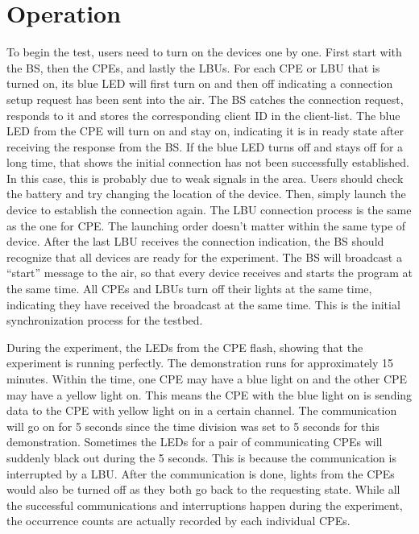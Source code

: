 \section{Operation}

To begin the test, users need to turn on the devices one by one. First start with the BS, then the CPEs, and lastly the LBUs. For each CPE or LBU that is turned on, its blue LED will  first turn on and then off indicating a connection setup request has been sent into the air. The BS catches the connection request, responds to it and stores the corresponding client ID in the client-list. The blue LED from the CPE will turn on and stay on, indicating it is in ready state after receiving the response from the BS. If the blue LED turns off and stays off for a long time, that shows the initial connection has not been successfully established. In this case, this is probably due to weak signals in the area. Users should check the battery and try changing the location of the device. Then, simply launch the device to establish the connection again. The LBU connection process is the same as the one for CPE. The launching order doesn't matter within the same type of device. After the last LBU receives the connection indication, the BS should recognize that all devices are ready for the experiment. The BS will broadcast a ``start'' message to the air, so that every device receives and starts the program at the same time. All CPEs and LBUs turn off their lights at the same time, indicating they have received the broadcast at the same time. This is the initial synchronization process for the testbed.

During the experiment, the LEDs from the CPE flash, showing that the experiment is running perfectly. The demonstration runs for approximately 15 minutes. Within the time, one CPE may have a blue light on and the other CPE may have a yellow light on. This means the CPE with the blue light on is sending data to the CPE with yellow light on in a certain channel. The communication will go on for 5 seconds since the time division was set to 5 seconds for this demonstration. Sometimes the LEDs for a pair of communicating CPEs will suddenly black out during the 5 seconds. This is because the communication is interrupted by a LBU. After the communication is done, lights from the CPEs would also be turned off as they both go back to the requesting state. While all the successful communications and interruptions happen during the experiment, the occurrence counts are actually recorded by each individual CPEs. 

